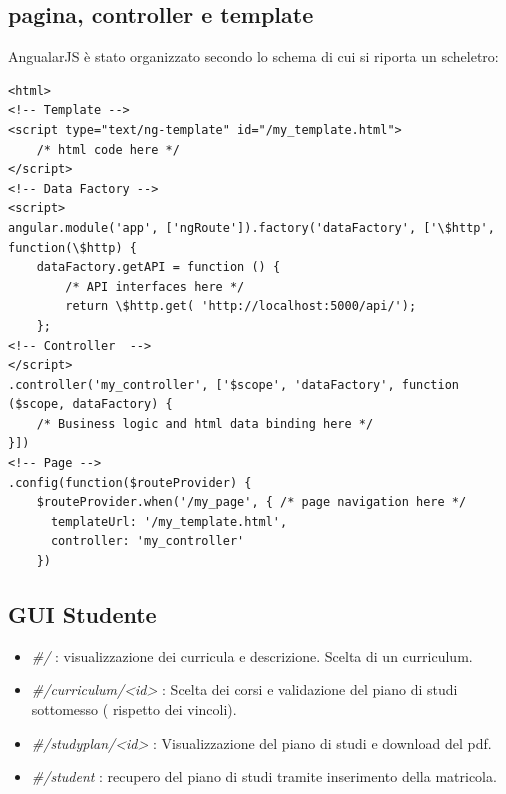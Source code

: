 \documentclass{article}
\begin{document}
\subsection{pagina, controller e template}
AngualarJS è stato organizzato secondo lo schema di cui si riporta un scheletro:
\begin{lstlisting}[caption = AngualrJS structure ]
<html>
<!-- Template -->
<script type="text/ng-template" id="/my_template.html">
	/* html code here */
</script>
<!-- Data Factory -->
<script>
angular.module('app', ['ngRoute']).factory('dataFactory', ['\$http', function(\$http) {
    dataFactory.getAPI = function () {
        /* API interfaces here */
        return \$http.get( 'http://localhost:5000/api/');
    };
<!-- Controller  -->
</script>
.controller('my_controller', ['$scope', 'dataFactory', function ($scope, dataFactory) {
    /* Business logic and html data binding here */
}])
<!-- Page -->
.config(function($routeProvider) {
    $routeProvider.when('/my_page', { /* page navigation here */
      templateUrl: '/my_template.html',
      controller: 'my_controller'
    })
\end{lstlisting}

\newpage
\subsection{GUI Studente}

\begin{itemize}
\item \emph{\#/} : visualizzazione dei curricula e descrizione. Scelta di un curriculum.
\item \emph{\#/curriculum/<id>} : Scelta dei corsi e validazione del piano di studi sottomesso ( rispetto dei vincoli).
\item \emph{\#/studyplan/<id>} : Visualizzazione del piano di studi e download del pdf.
\item \emph{\#/student} : recupero del piano di studi tramite inserimento della matricola.
\end{itemize}
\end{document}
